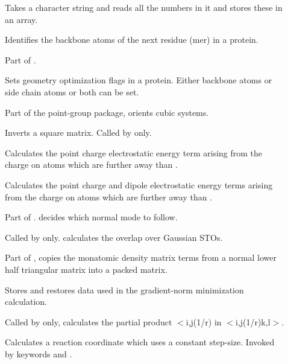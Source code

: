 \begin{description}
\item[] Takes a character string and reads all the numbers in it
and stores these in an array.

\item[] Identifies the backbone atoms of the next residue (mer) in
a protein.

\item[] Part of .

\item[] Sets geometry optimization flags in a protein.  Either
backbone atoms or side chain atoms or both can be set.

\item[] Part of the point-group package,  orients
cubic systems.

\item[] Inverts a square matrix. Called by  only.

\item[] Calculates the point charge electrostatic energy term 
arising from the charge on atoms which are further away than .

\item[] Calculates the point charge and dipole electrostatic
 energy terms arising from the charge on atoms which are further away than
 .

\item[] Part of .  decides which normal mode
to  follow.

\item[] Called by  only.   calculates the
overlap over Gaussian STOs.

\item[] Part of ,  copies the monatomic
density matrix terms from a normal lower half triangular matrix into a packed
matrix. 

\item[] Stores and restores data used in the gradient-norm
minimization calculation.

\item[] Called by  only,  calculates the
partial product $<$i,j(1/r) in $<$i,j(1/r)k,l$>$.

\item[] Calculates a reaction coordinate which uses a constant
step-size.  Invoked by keywords  and . 


\end{description}
